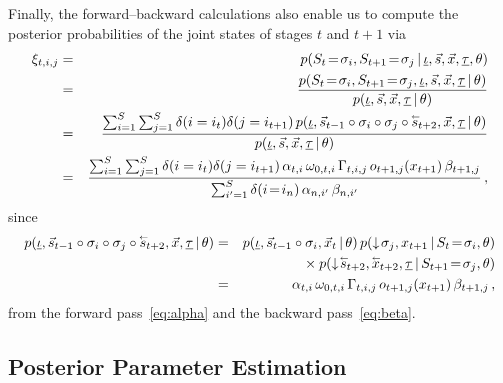 \documentclass[a4paper]{article}
\newcommand{\rvec}[1]{\accentset{\leftarrow}{#1}}
\newcommand{\dn}{\downarrow\!}
\begin{document}
Finally, the forward--backward calculations also enable us to compute the posterior probabilities of the joint states of stages $t$ and $t+1$ via
\begin{eqnarray}
\xi_{t,i,j} & = &
   p(S_t\!=\!\sigma_i,S_{t+1}\!=\!\sigma_j\,|\,\underline{\iota},\vec{s},\vec{x},\underline{\tau},\theta)
\nonumber\\& = & 
   \frac{p(S_t\!=\!\sigma_i,S_{t+1}\!=\!\sigma_j,\underline{\iota},\vec{s},\vec{x},\underline{\tau}\,|\,\theta)}
        {p(\underline{\iota},\vec{s},\vec{x},\underline{\tau}\,|\,\theta)}
\nonumber\\& = & 
\frac{\sum_{i=1}^{S}\sum_{j=1}^{S}\delta(i=i_{t})\delta(j=i_{t+1})\,
   p(\underline{\iota},\vec{s}_{t-1}\circ\sigma_{i}\circ\sigma_{j}\circ\rvec{s}_{t+2},\vec{x},\underline{\tau}\,|\,\theta)}
        {p(\underline{\iota},\vec{s},\vec{x},\underline{\tau}\,|\,\theta)}
\nonumber\\& = & 
\frac{\sum_{i=1}^{S}\sum_{j=1}^{S}\delta(i=i_{t})\delta(j=i_{t+1})\,\alpha_{t,i}\,\omega_{0,t,i}\,\Gamma_{t,i,j}\,o_{t+1,j}(x_{t+1})\,\beta_{t+1,j}}
{\sum_{i'=1}^S\delta(i\!=\!i_n)\,\alpha_{n,i'}\,\beta_{n,i'}}\,,
\label{eq:xi_t_i_j}
\end{eqnarray}
since
\begin{eqnarray}
p(\underline{\iota},\vec{s}_{t-1}\circ\sigma_{i}\circ\sigma_{j}\circ\rvec{s}_{t+2},\vec{x},\underline{\tau}\,|\,\theta)
& = &
p(\underline{\iota},\vec{s}_{t-1}\circ\sigma_{i},\vec{x}_t\,|\,\theta)\,p(\dn\sigma_j,x_{t+1}\,|\,S_{t}\!=\!\sigma_i,\theta)
\nonumber\\&&{}\times
p(\dn\rvec{s}_{t+2},\rvec{x}_{t+2},\underline{\tau}\,|\,S_{t+1}\!=\!\sigma_j,\theta)
\nonumber\\& = &
\alpha_{t,i}\,\omega_{0,t,i}\,\Gamma_{t,i,j}\,o_{t+1,j}(x_{t+1})\,\beta_{t+1,j}\,,
\end{eqnarray}
from the forward pass~\eqref{eq:alpha} and the backward pass~\eqref{eq:beta}.

\subsection{Posterior Parameter Estimation}
\end{document}
